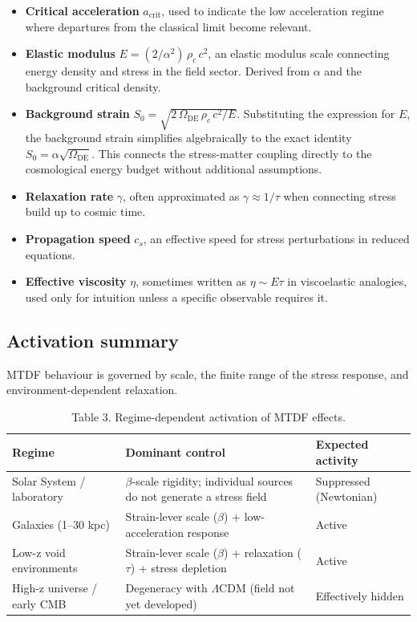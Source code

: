 \documentclass[11pt,a4paper]{article}
\begin{document}
\begin{itemize}
  \item \textbf{Critical acceleration} \(a_\mathrm{crit}\), used to indicate the low acceleration regime where departures from the classical limit become relevant.
  \item \textbf{Elastic modulus} \(E = (2/\alpha^2)\,\rho_c\,c^2\), an elastic modulus scale connecting energy density and stress in the field sector. Derived from $\alpha$ and the background critical density.
  \item \textbf{Background strain} \(S_0 = \sqrt{2\,\Omega_\mathrm{DE}\,\rho_c\,c^2/E}\). Substituting the expression for \(E\), the background strain simplifies algebraically to the exact identity \(S_0 = \alpha\sqrt{\Omega_\mathrm{DE}}\). This connects the stress-matter coupling directly to the cosmological energy budget without additional assumptions.
  \item \textbf{Relaxation rate} \(\gamma\), often approximated as \(\gamma \approx 1/\tau\) when connecting stress build up to cosmic time.
  \item \textbf{Propagation speed} \(c_s\), an effective speed for stress perturbations in reduced equations.
  \item \textbf{Effective viscosity} \(\eta\), sometimes written as \(\eta \sim E\tau\) in viscoelastic analogies, used only for intuition unless a specific observable requires it.
\end{itemize}

\subsection{Activation summary}
MTDF behaviour is governed by scale, the finite range of the stress response, and environment-dependent relaxation.

\begin{table}[H]
\centering
\footnotesize
\caption{Table 3. Regime-dependent activation of MTDF effects.}
\begin{tabularx}{\linewidth}{l>{\RaggedRight\arraybackslash}X>{\RaggedRight\arraybackslash}X}
\toprule
\textbf{Regime} & \textbf{Dominant control} & \textbf{Expected activity} \tabularnewline
\midrule
Solar System / laboratory & $\beta$-scale rigidity; individual sources do not generate a stress field & Suppressed (Newtonian) \tabularnewline
Galaxies (1--30 kpc) & Strain-lever scale ($\beta$) + low-acceleration response & Active \tabularnewline
Low-z void environments & Strain-lever scale ($\beta$) + relaxation ($\tau$) + stress depletion & Active \tabularnewline
High-z universe / early CMB & Degeneracy with $\Lambda$CDM (field not yet developed) & Effectively hidden \tabularnewline
\bottomrule
\end{tabularx}
\end{table}
\end{document}
